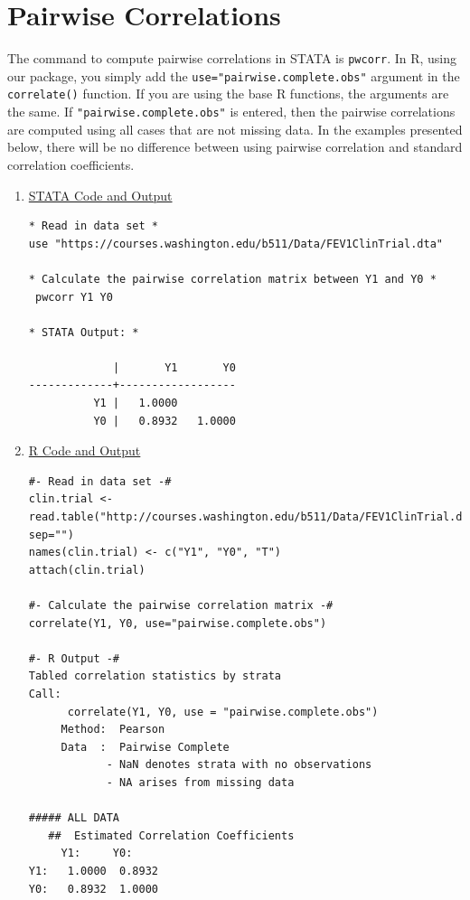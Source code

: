 \documentclass[11pt,letterpaper,fleqn]{report}
\begin{document}
\section{Pairwise Correlations}
The command to compute pairwise correlations in STATA is \texttt{pwcorr}. In R, using our package, you simply add the \texttt{use="pairwise.complete.obs"} argument in the \texttt{correlate()} function. If you are using the base R functions, the arguments are the same. If \texttt{"pairwise.complete.obs"} is entered, then the pairwise correlations are computed using all cases that are not missing data. In the examples presented below, there will be no difference between using pairwise correlation and standard correlation coefficients.
\begin{enumerate}[]
\item \underline{STATA Code and Output}
{\scriptsize
\begin{verbatim}
* Read in data set *
use "https://courses.washington.edu/b511/Data/FEV1ClinTrial.dta"

* Calculate the pairwise correlation matrix between Y1 and Y0 *
 pwcorr Y1 Y0

* STATA Output: *

             |       Y1       Y0
-------------+------------------
          Y1 |   1.0000 
          Y0 |   0.8932   1.0000 

\end{verbatim}}
\item \underline{R Code and Output}
{\scriptsize
\begin{verbatim}
#- Read in data set -#
clin.trial <- read.table("http://courses.washington.edu/b511/Data/FEV1ClinTrial.dat", sep="")
names(clin.trial) <- c("Y1", "Y0", "T")
attach(clin.trial)

#- Calculate the pairwise correlation matrix -#
correlate(Y1, Y0, use="pairwise.complete.obs")

#- R Output -# 
Tabled correlation statistics by strata
Call:
      correlate(Y1, Y0, use = "pairwise.complete.obs") 
     Method:  Pearson 
     Data  :  Pairwise Complete 
            - NaN denotes strata with no observations
            - NA arises from missing data

##### ALL DATA
   ##  Estimated Correlation Coefficients 
     Y1:     Y0:    
Y1:   1.0000  0.8932
Y0:   0.8932  1.0000
\end{verbatim}}
\end{enumerate}
\end{document}
